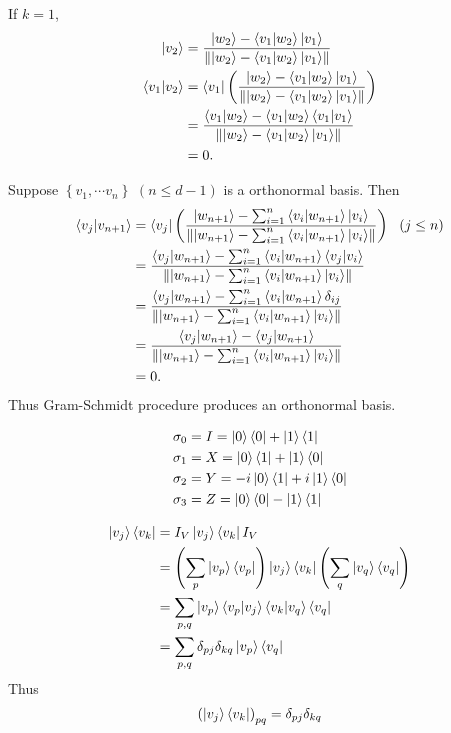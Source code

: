 
If $k = 1$,
\begin{align*}
	\ket{v_2} &= \frac{\ket{w_2} - \braket{v_1 | w_2}\ket{v_1}}{\left\lVert\ket{w_2} - \braket{v_1 | w_2}\ket{v_1}\right\rVert}\\
	\braket{v_1 | v_2} &= \bra{v_1} \left(\frac{\ket{w_2} - \braket{v_1 | w_2}\ket{v_1}}{\left\lVert\ket{w_2} - \braket{v_1 | w_2}\ket{v_1}\right\rVert}\right)\\
		&= \frac{\braket{v_1 | w_2} - \braket{v_1 | w_2}\braket{v_1 | v_1}}{\left\lVert\ket{w_2} - \braket{v_1 | w_2}\ket{v_1}\right\rVert}\\
		&= 0.
\end{align*}

Suppose $\left\{v_1, \cdots v_n \right\}$ $(n \leq d-1)$ is a orthonormal basis. Then
\begin{align*}
	\braket{v_j | v_{n+1}} &= \bra{v_j} \left(\frac{\ket{w_{n+1}} - \sum_{i=1}^{n}\braket{v_i | w_{n+1}}\ket{v_i}}{\left\lVert\ket{w_{n+1}} - \sum_{i=1}^{n}\braket{v_i | w_{n+1}}\ket{v_i}\right\rVert}\right)~~(j \leq n)\\
	&= \frac{\braket{v_j | w_{n+1}} - \sum_{i=1}^{n}\braket{v_i | w_{n+1}}\braket{v_j | v_i}}{\left\lVert\ket{w_{n+1}} - \sum_{i=1}^{n}\braket{v_i | w_{n+1}}\ket{v_i}\right\rVert}\\
	&= \frac{\braket{v_j | w_{n+1}} - \sum_{i=1}^{n}\braket{v_i | w_{n+1}}\delta_{ij}}{\left\lVert\ket{w_{n+1}} - \sum_{i=1}^{n}\braket{v_i | w_{n+1}}\ket{v_i}\right\rVert}\\
	&= \frac{\braket{v_j | w_{n+1}} - \braket{v_j | w_{n+1}}}{\left\lVert\ket{w_{n+1}} - \sum_{i=1}^{n}\braket{v_i | w_{n+1}}\ket{v_i}\right\rVert}\\
	&= 0.
\end{align*}
Thus Gram-Schmidt procedure produces an orthonormal basis.



\begin{align*}
	\sigma_0 &= I = \ket{0}\bra{0} + \ket{1}\bra{1}\\
	\sigma_1 &= X = \ket{0}\bra{1} + \ket{1}\bra{0}\\
	\sigma_2 &= Y = -i\ket{0}\bra{1} + i\ket{1}\bra{0}\\
	\sigma_3 &= Z = \ket{0}\bra{0} - \ket{1}\bra{1}
\end{align*}



\begin{align*}
	\ket{v_j}\bra{v_k} &= I_V \ket{v_j} \bra{v_k} I_V\\
	&= \left(\sum_p \ket{v_p}\bra{v_p} \right) \ket{v_j}\bra{v_k} \left(\sum_q \ket{v_q}\bra{v_q} \right)\\
	&= \sum_{p,q} \ket{v_p} \braket{v_p|v_j}
	\braket{v_k | v_q} \bra{v_q}\\
	&= \sum_{p,q} \delta_{pj} \delta_{kq} \ket{v_p} \bra{v_q}
\end{align*}
Thus
\begin{align*}
	\left( \ket{v_j}\bra{v_k} \right)_{pq} = \delta_{pj} \delta_{kq}
\end{align*}



